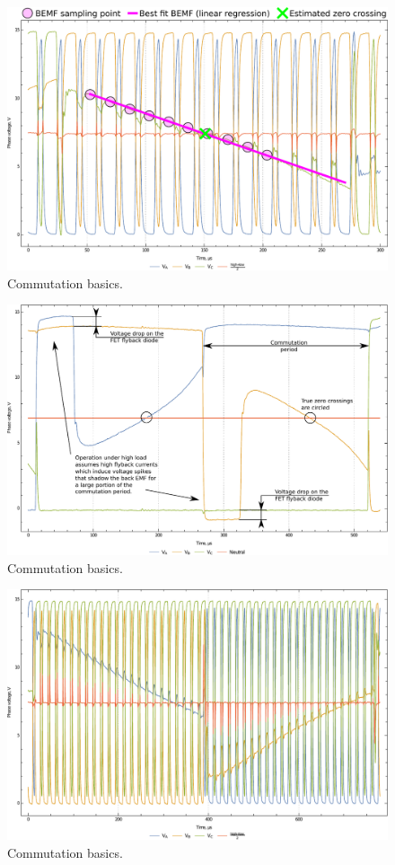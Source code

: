 \documentclass{zubaxdoc}
\begin{document}
\begin{figure}[hb]
    \centering
	\includegraphics[width=\textwidth]{phase_voltage_sampling}
	\caption{Commutation basics.\label{phase_voltage_sampling}}
\end{figure}
\begin{figure}[hb]
    \centering
	\includegraphics[width=\textwidth]{phase_voltages_at_high_load}
	\caption{Commutation basics.\label{phase_voltages_at_high_load}}
\end{figure}
\begin{figure}[hb]
    \centering
	\includegraphics[width=\textwidth]{phase_voltages_at_high_advance_angle}
	\caption{Commutation basics.\label{phase_voltages_at_high_advance_angle}}
\end{figure}
\end{document}
